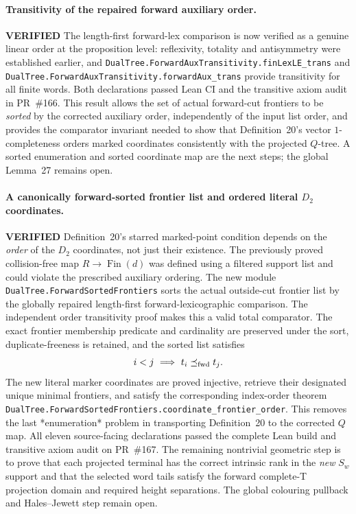 \documentclass[11pt]{article}
\newcommand{\ok}{\textcolor{green!40!black}{\textbf{VERIFIED}}}
\newcommand{\lean}[1]{\texttt{#1}}
\begin{document}
\paragraph{Transitivity of the repaired forward auxiliary order.} \ok
The length-first forward-lex comparison is now
verified as a genuine linear order at the
proposition level: reflexivity, totality and
antisymmetry were established earlier, and
\lean{DualTree.ForwardAuxTransitivity.finLexLE_trans}
and
\lean{DualTree.ForwardAuxTransitivity.forwardAux_trans}
provide transitivity for all finite words.
Both declarations passed Lean CI and the transitive axiom audit
in PR~\#166. This result allows
the set of actual forward-cut frontiers
to be \emph{sorted} by the corrected
auxiliary order, independently of the input
list order, and provides the comparator
invariant needed to show that Definition~20's
vector $1$-completeness orders marked
coordinates consistently with the projected
$Q$-tree. A sorted enumeration and sorted
coordinate map are the next steps; the
global Lemma~27 remains open.

\paragraph{A canonically forward-sorted frontier list and ordered literal $D_2$ coordinates.} \ok
Definition~20's starred marked-point condition
depends on the \emph{order} of the $D_2$
coordinates, not just their existence.
The previously proved collision-free map
$R\to\operatorname{Fin}(d)$ was defined
using a filtered support list and could
violate the prescribed auxiliary ordering.
The new module
\lean{DualTree.ForwardSortedFrontiers}
sorts the actual outside-cut frontier list
by the globally repaired length-first
forward-lexicographic comparison.
The independent order transitivity proof
makes this a valid total comparator.
The exact frontier membership predicate
and cardinality are preserved under the
sort, duplicate-freeness is retained,
and the sorted list satisfies
\[
  i<j \ \Longrightarrow\
  t_i\preceq_{\rm fwd}t_j.
\]
The new literal marker coordinates are
proved injective, retrieve their designated
unique minimal frontiers, and satisfy
the corresponding index-order theorem
\lean{DualTree.ForwardSortedFrontiers.coordinate_frontier_order}.
This removes the last *enumeration*
problem in transporting Definition~20
to the corrected $Q$ map.
All eleven source-facing declarations passed the complete Lean build
and transitive axiom audit on PR~\#167.
The remaining nontrivial geometric step is
to prove that each projected terminal
has the correct intrinsic rank in the
\emph{new} $S_w$ support and that the
selected word tails satisfy the forward
complete-T projection domain and
required height separations.
The global colouring pullback and
Hales--Jewett step remain open.
\end{document}

